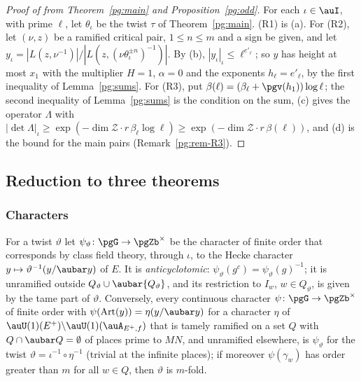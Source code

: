 \documentclass[10pt]{amsart}
\theoremstyle{definition}
\theoremstyle{remark}
\begin{document}
\begin{proof}[Proof of {\cite[Proposition~14.40]{P46}} from Theorem~\ref{pg:main} and
Proposition~\ref{pg:odd}]
For each $\iota\in\auI$, with prime $\ell$, let $\theta_\iota$ be the twist $\tau$ of
Theorem~\ref{pg:main}. (R1) is (a). For (R2), let $(\nu,z)$ be a ramified critical pair,
$1\le n\le m$ and a sign be given, and let $y_\iota=|L(z,\nu^{-1})|/|L(z,(\nu\theta_\iota^{\pm
n})^{-1})|$. By (b), $|y_\iota|_\iota\le\ell^{e'_\ell}$; so $y$ has height at most $x_1$ with the
multiplier $H=1$, $\alpha=0$ and the exponents $h_\ell=e'_\ell$, by the first inequality of
Lemma~\ref{pg:sums}. For (R3), put $\beta(\ell)=(\beta_\ell+\pgv(h_1))\log\ell$; the second
inequality of Lemma~\ref{pg:sums} is the condition on the sum, (c) gives the operator $\Lambda$
with $|\det\Lambda|_\iota\ge\exp(-\dim\mathcal Z\cdot r\,\beta_\ell\log\ell)\ge\exp(-\dim\mathcal
Z\cdot r\,\beta(\ell))$, and (d) is the bound for the main pairs (Remark~\ref{pg:rem-R3}).
\end{proof}

\subsection{Reduction to three theorems}\label{pg:ss-reduction}

\subsubsection*{Characters}
For a twist $\vartheta$ let $\psi_\vartheta\colon\pgG\to\pgZb^\times$ be the character of finite
order that corresponds by class field theory, through $\iota$, to the Hecke character
$y\mapsto\vartheta^{-1}(y/\aubar y)$ of $E$. It is \emph{anticyclotomic}:
$\psi_\vartheta(g^c)=\psi_\vartheta(g)^{-1}$; it is unramified outside $Q_\vartheta\cup\aubar{
Q_\vartheta}$, and its restriction to $I_w$, $w\in Q_\vartheta$, is given by the tame part of
$\vartheta$. Conversely, every continuous character $\psi\colon\pgG\to\pgZb^\times$ of finite order
with $\psi(\mathrm{Art}(y))=\eta(y/\aubar y)$ for a character $\eta$ of $\auU(1)(E^+)\backslash
\auU(1)(\auA_{E^+,f})$ that is tamely ramified on a set $Q$ with $Q\cap\aubar Q=\emptyset$ of
places prime to $MN$, and unramified elsewhere, is $\psi_\vartheta$ for the twist
$\vartheta=\iota^{-1}\circ\eta^{-1}$ (trivial at the infinite places); if moreover $\psi(\gamma_w)$
has order greater than $m$ for all $w\in Q$, then $\vartheta$ is $m$-fold.
\end{document}
